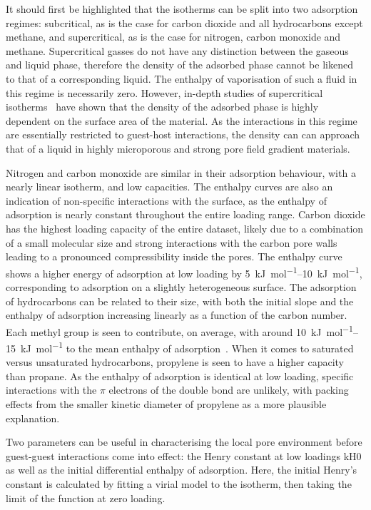 It should first be highlighted that the isotherms can be split into 
two adsorption regimes: subcritical, as is the case for carbon
dioxide and all hydrocarbons except methane, and supercritical,
as is the case for nitrogen, carbon monoxide and methane.
Supercritical gasses do not have any distinction between the 
gaseous and liquid phase, therefore the density of the adsorbed phase
cannot be likened to that of a corresponding liquid. The enthalpy
of vaporisation of such a fluid in this regime is necessarily zero.
However, in-depth studies of supercritical 
isotherms~\cite{doAdsorptionSupercriticalFluids2003} have shown that
the density of the adsorbed phase is highly dependent on the surface 
area of the material. As the interactions in this regime are essentially
restricted to guest-host interactions, the density can can approach that
of a liquid in highly microporous and strong pore field gradient materials.

Nitrogen and carbon monoxide are similar in their adsorption behaviour,
with a nearly linear isotherm, and low capacities.
The enthalpy curves are also an indication of non-specific 
interactions with the surface, as the enthalpy of adsorption
is nearly constant throughout the entire loading range.
Carbon dioxide has the highest loading capacity of the entire dataset, 
likely due to a combination of a small molecular size and strong 
interactions with the carbon pore walls leading to a pronounced 
compressibility inside the pores. The enthalpy curve shows a higher energy
of adsorption at low loading by \SIrange{5}{10}{\kilo\joule\per\mole}, 
corresponding to adsorption on a slightly heterogeneous surface.
The adsorption of hydrocarbons can be related to their size, with
both the initial slope and the enthalpy of adsorption increasing linearly
as a function of the carbon number. Each methyl group is seen 
to contribute, on average, with around 
\SIrange{10}{15}{\kilo\joule\per\mole}
to the mean enthalpy of adsorption~\cite{denayerChromatographicStudyAdsorption1998}.
When it comes to saturated versus unsaturated hydrocarbons, propylene is 
seen to have a higher capacity than propane. As the enthalpy of 
adsorption is identical at low loading, specific interactions with the 
\(\pi\) electrons of the double bond are unlikely, with packing effects 
from the smaller kinetic diameter of propylene as a more plausible
explanation.

Two parameters can be useful in characterising the local pore environment
before guest-guest interactions come into effect: the Henry constant at
low loadings \gls{kH0} as well as the initial differential enthalpy of
adsorption. Here, the initial Henry's constant is calculated by fitting
a virial model to the isotherm, then taking the limit of the function at
zero loading. 

